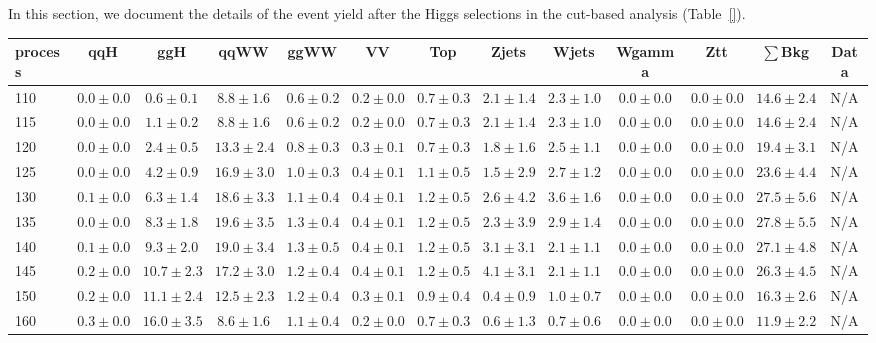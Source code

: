 In this section, we document the details of the event yield after the Higgs 
selections in the cut-based analysis (Table~\ref{}). 

\begin{table}
{%
 \tiny
 \begin{center}
 \begin{tabular}{l | c c | c c c c c c c c  | c c}
 \hline
 process & qqH & ggH & qqWW & ggWW & VV & Top & Zjets & Wjets & Wgamma & Ztt & $\sum$Bkg & Data \\
 \hline
110 & $0.0\pm0.0$ & $0.6\pm0.1$ & $8.8\pm1.6$ & $0.6\pm0.2$ & $0.2\pm0.0$ & $0.7\pm0.3$ & $2.1\pm1.4$ & $2.3\pm1.0$ & $0.0\pm0.0$ & $0.0\pm0.0$ & $14.6\pm2.4$ & N/A \\ 
115 & $0.0\pm0.0$ & $1.1\pm0.2$ & $8.8\pm1.6$ & $0.6\pm0.2$ & $0.2\pm0.0$ & $0.7\pm0.3$ & $2.1\pm1.4$ & $2.3\pm1.0$ & $0.0\pm0.0$ & $0.0\pm0.0$ & $14.6\pm2.4$ & N/A \\ 
120 & $0.0\pm0.0$ & $2.4\pm0.5$ & $13.3\pm2.4$ & $0.8\pm0.3$ & $0.3\pm0.1$ & $0.7\pm0.3$ & $1.8\pm1.6$ & $2.5\pm1.1$ & $0.0\pm0.0$ & $0.0\pm0.0$ & $19.4\pm3.1$ & N/A \\
125 & $0.0\pm0.0$ & $4.2\pm0.9$ & $16.9\pm3.0$ & $1.0\pm0.3$ & $0.4\pm0.1$ & $1.1\pm0.5$ & $1.5\pm2.9$ & $2.7\pm1.2$ & $0.0\pm0.0$ & $0.0\pm0.0$ & $23.6\pm4.4$ & N/A \\
130 & $0.1\pm0.0$ & $6.3\pm1.4$ & $18.6\pm3.3$ & $1.1\pm0.4$ & $0.4\pm0.1$ & $1.2\pm0.5$ & $2.6\pm4.2$ & $3.6\pm1.6$ & $0.0\pm0.0$ & $0.0\pm0.0$ & $27.5\pm5.6$ & N/A \\
135 & $0.0\pm0.0$ & $8.3\pm1.8$ & $19.6\pm3.5$ & $1.3\pm0.4$ & $0.4\pm0.1$ & $1.2\pm0.5$ & $2.3\pm3.9$ & $2.9\pm1.4$ & $0.0\pm0.0$ & $0.0\pm0.0$ & $27.8\pm5.5$ & N/A \\
140 & $0.1\pm0.0$ & $9.3\pm2.0$ & $19.0\pm3.4$ & $1.3\pm0.5$ & $0.4\pm0.1$ & $1.2\pm0.5$ & $3.1\pm3.1$ & $2.1\pm1.1$ & $0.0\pm0.0$ & $0.0\pm0.0$ & $27.1\pm4.8$ & N/A \\
145 & $0.2\pm0.0$ & $10.7\pm2.3$ & $17.2\pm3.0$ & $1.2\pm0.4$ & $0.4\pm0.1$ & $1.2\pm0.5$ & $4.1\pm3.1$ & $2.1\pm1.1$ & $0.0\pm0.0$ & $0.0\pm0.0$ & $26.3\pm4.5$ & N/A \\
150 & $0.2\pm0.0$ & $11.1\pm2.4$ & $12.5\pm2.3$ & $1.2\pm0.4$ & $0.3\pm0.1$ & $0.9\pm0.4$ & $0.4\pm0.9$ & $1.0\pm0.7$ & $0.0\pm0.0$ & $0.0\pm0.0$ & $16.3\pm2.6$ & N/A \\
160 & $0.3\pm0.0$ & $16.0\pm3.5$ & $8.6\pm1.6$ & $1.1\pm0.4$ & $0.2\pm0.0$ & $0.7\pm0.3$ & $0.6\pm1.3$ & $0.7\pm0.6$ & $0.0\pm0.0$ & $0.0\pm0.0$ & $11.9\pm2.2$ & N/A \\ 

\end{tabular}
\end{center}}
\end{table}
